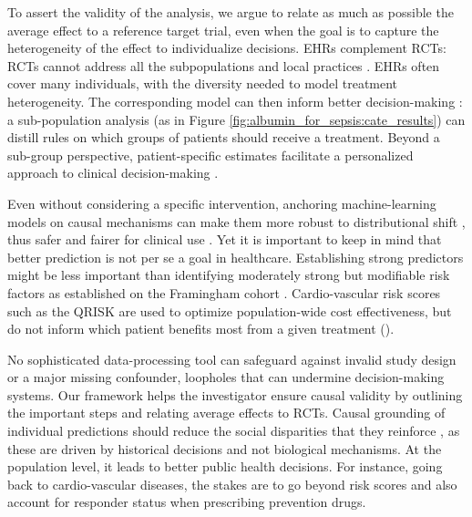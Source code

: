 \documentclass[10pt,letterpaper]{article}
\begin{document}
To assert the validity of the analysis, we argue to relate as much as
possible the average effect to a reference target trial, even when the
goal is to capture the heterogeneity of the effect to individualize
decisions.
EHRs complement RCTs: RCTs cannot address all the
subpopulations and local practices
\cite{travers2007external,kennedy2015literature}. EHRs often cover many
individuals, with the diversity needed to model treatment
heterogeneity. The corresponding model can then inform better
decision-making \cite{prosperi2020causal}: a sub-population analysis  (as in Figure
\ref{fig:albumin_for_sepsis:cate_results}) can distill rules on which groups
of patients should receive a treatment. Beyond a sub-group perspective,
patient-specific estimates facilitate a personalized approach
to clinical decision-making \cite{kent2018personalized}.
%

Even without considering a specific intervention, anchoring
machine-learning models on
causal mechanisms can make them more robust to distributional shift \cite{scholkopf2021toward},
thus safer and fairer for clinical use
\cite{richens2020improving,plecko2022causal}.
%
Yet it is important to keep in mind that better prediction is not per se
a goal in healthcare.
%
Establishing strong predictors might be less important than identifying
moderately strong but modifiable risk factors as established on the Framingham
cohort \cite{brand1976multivariate}.
Cardio-vascular risk scores such as the QRISK are used to optimize
population-wide cost
effectiveness, but do not inform which patient benefits most from a given
treatment ().

No sophisticated data-processing tool can safeguard against
invalid study design or a major missing confounder, loopholes that can
undermine decision-making systems. Our framework helps the investigator
ensure
causal validity by outlining the important steps and relating average effects to
RCTs. Causal grounding of individual predictions should reduce the social
disparities that they reinforce
\cite{rajkomar2018ensuring,mitra2022future,ehrmann2023making}, as these are driven by
historical decisions and not biological mechanisms. At the population
level, it leads to better public health decisions. For instance, going
back to cardio-vascular diseases, the stakes are to go beyond risk
scores and also account for responder status when prescribing prevention
drugs.
\end{document}
